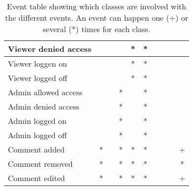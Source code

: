 \begin{table}[H]
{\begin{tabular}{|l||c|c|c|c|c|c|c|c|c|}
        \hline
        Viewer denied access & & & & * & * & & & & \\
        \hline
        Viewer loggen on & & & & * & * & & & & \\
        \hline
        Viewer logged off & & & & * & * & & & & \\
        \hline
        \hline
        Admin allowed access & & & * & & * & & & & \\
        \hline
        Admin denied access & & & * & & * & & & & \\
        \hline
        Admin logged on & & & * & & * & & & & \\
        \hline
        Admin logged off & & & * & & * & & & & \\
        \hline
        \hline
        Comment added & * & & * & * & * & & & & + \\
        \hline
        Comment removed & * & & * & * & * & & & & * \\
        \hline
        Comment edited & * & & * & * & * & & & & + \\
        \hline
    \end{tabular}
}
\caption{Event table showing which classes are involved with the different events. An event can happen one (+) or several (*) times for each class.}\label{tab:events}
\end{table}

